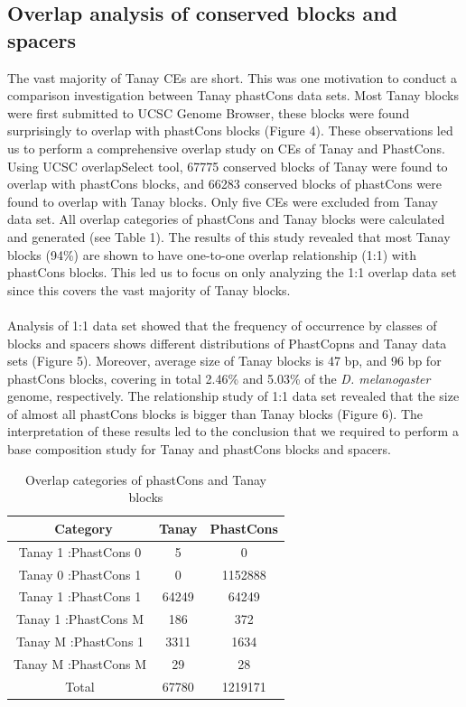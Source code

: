 \documentclass[12pt]{report}
\begin{document}
\subsection{Overlap analysis of conserved blocks and spacers}
The vast majority of Tanay CEs are short. This was one motivation to conduct a comparison investigation between Tanay phastCons data sets. Most Tanay blocks were first submitted to UCSC Genome Browser, these blocks were found surprisingly to overlap with phastCons blocks (Figure 4). These observations led us to perform a comprehensive overlap study on CEs of Tanay and PhastCons. Using UCSC overlapSelect tool, 67775 conserved blocks of Tanay were found to overlap with phastCons blocks, and 66283 conserved blocks of phastCons were found to overlap with Tanay blocks. Only five CEs were excluded from Tanay data set. All overlap categories of phastCons and Tanay blocks were calculated and generated (see Table 1). The results of this study revealed that most Tanay blocks (94\%) are shown to have one-to-one overlap relationship (1:1) with phastCons blocks. This led us to focus on only analyzing the 1:1 overlap data set since this covers the vast majority of Tanay blocks.\\\\
Analysis of 1:1 data set showed that the frequency of occurrence by classes of blocks and spacers shows different distributions of PhastCopns and Tanay data sets (Figure 5). Moreover, average size of Tanay blocks is 47 bp, and 96 bp for phastCons blocks, covering in total 2.46\% and 5.03\% of the \textit{D. melanogaster} genome, respectively. The relationship study of 1:1 data set revealed that the size of almost all phastCons blocks is bigger than Tanay blocks (Figure 6). The interpretation of these results led to the conclusion that we required to perform a base composition study for Tanay and phastCons blocks and spacers.\\

\begin{table}[ht]
\centering
\begin{tabular}{c c c}
\hline\hline
\ Category & Tanay & PhastCons \\ [0.5ex]
\hline
Tanay 1 :PhastCons 0 & 5 & 0 \\
Tanay 0 :PhastCons 1 & 0 & 1152888 \\
Tanay 1 :PhastCons 1 & 64249 & 64249 \\
Tanay 1 :PhastCons M & 186 & 372 \\
Tanay M :PhastCons 1 & 3311 & 1634 \\ 
Tanay M :PhastCons M & 29 & 28 \\
\hline
Total & 67780 & 1219171 \\ [1ex]
\hline\hline
\end{tabular}
\caption[Caption for LOF]{\centering Overlap categories of phastCons and Tanay blocks}
\end{table}
 
\end{document}
